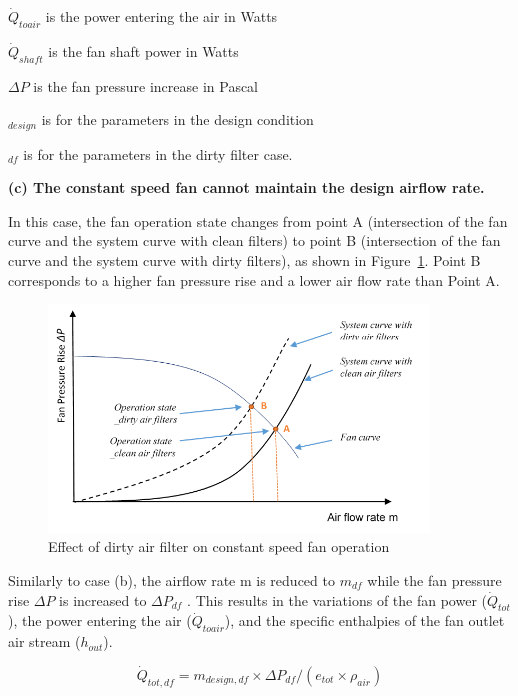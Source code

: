 \(\dot{Q}_{toair}\) is the power entering the air in Watts

\(\dot{Q}_{shaft}\) is the fan shaft power in Watts

\(\Delta P\) is the fan pressure increase in Pascal

\(_{design}\) is for the parameters in the design condition

\(_{df}\) is for the parameters in the dirty filter case.

\textbf{(c) The constant speed fan cannot maintain the design airflow rate.}

In this case, the fan operation state changes from point A (intersection of the fan curve and the system curve with clean filters) to point B (intersection of the fan curve and the system curve with dirty filters), as shown in Figure~\ref{fig:effect-of-dirty-air-filter-on-constant-speed}. Point B corresponds to a higher fan pressure rise and a lower air flow rate than Point A.

\begin{figure}[hbtp] %
\centering
\includegraphics[width=0.9\textwidth, height=0.9\textheight, keepaspectratio=true]{media/image8008.png}
\caption{Effect of dirty air filter on constant speed fan operation \protect \label{fig:effect-of-dirty-air-filter-on-constant-speed}}
\end{figure}

Similarly to case (b), the airflow rate m is reduced to \(m_{df}\) while the fan pressure rise \(\Delta P\) is increased to \(\Delta P_{df}\) . This results in the variations of the fan power (\(\dot Q_{tot}\)), the power entering the air (\(\dot Q_{toair}\)), and the specific enthalpies of the fan outlet air stream (\(h_{out}\)).

\begin{equation}
\dot{Q}_{tot,df} = m_{design,df} \times \Delta P_{df} / (e_{tot} \times \rho_{air} )
\end{equation}

